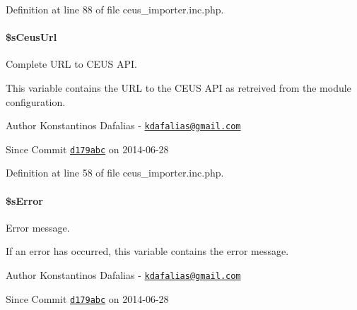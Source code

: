 Definition at line 88 of file ceus\+\_\+importer.\+inc.\+php.

\hypertarget{classceus__importer_a088b85eaa1fbe9e6fe82405cf865be87}{
\paragraph[{\$s\+Ceus\+Url}]{\setlength{\rightskip}{0pt plus 5cm}\$s\+Ceus\+Url\hspace{0.3cm}{\ttfamily [private]}}}\label{classceus__importer_a088b85eaa1fbe9e6fe82405cf865be87}


Complete U\+R\+L to C\+E\+U\+S A\+P\+I. 

This variable contains the U\+R\+L to the C\+E\+U\+S A\+P\+I as retreived from the module configuration.

\begin{DoxyAuthor}{Author}
Konstantinos Dafalias -\/ \href{mailto:kdafalias@gmail.com}{\tt kdafalias@gmail.\+com} 
\end{DoxyAuthor}
\begin{DoxySince}{Since}
Commit \href{http://github.com/TheJake123/DrupalModul/commit/d179abcc5e05743086cd67cf1ce30b08923a7183}{\tt d179abc} on 2014-\/06-\/28 
\end{DoxySince}


Definition at line 58 of file ceus\+\_\+importer.\+inc.\+php.

\hypertarget{classceus__importer_a92ce9963d72f9742e6e7051b23c478b6}{
\paragraph[{\$s\+Error}]{\setlength{\rightskip}{0pt plus 5cm}\$s\+Error\hspace{0.3cm}{\ttfamily [private]}}}\label{classceus__importer_a92ce9963d72f9742e6e7051b23c478b6}


Error message. 

If an error has occurred, this variable contains the error message.

\begin{DoxyAuthor}{Author}
Konstantinos Dafalias -\/ \href{mailto:kdafalias@gmail.com}{\tt kdafalias@gmail.\+com} 
\end{DoxyAuthor}
\begin{DoxySince}{Since}
Commit \href{http://github.com/TheJake123/DrupalModul/commit/d179abcc5e05743086cd67cf1ce30b08923a7183}{\tt d179abc} on 2014-\/06-\/28 
\end{DoxySince}


